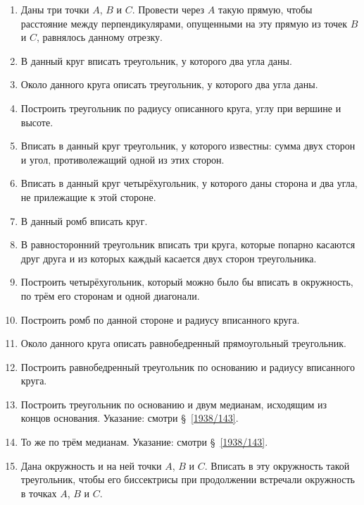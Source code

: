 \documentclass[oneside]{book}
\begin{document}
\begin{enumerate}[resume]
 \item
Даны три точки $A$, $B$ и $C$.
Провести через $A$ такую прямую, чтобы расстояние между перпендикулярами, опущенными на эту прямую из точек $B$ и $C$, равнялось данному отрезку.

 \item
В данный круг вписать треугольник, у которого два угла даны.

 \item
Около данного круга описать треугольник, у которого два угла даны.

 \item
Построить треугольник по радиусу описанного круга, углу при вершине и высоте.

 \item
Вписать в данный круг треугольник, у которого известны:
сумма двух сторон и угол, противолежащий одной из этих сторон.

 \item
Вписать в данный круг четырёхугольник, у которого даны сторона и два угла, не прилежащие к этой стороне.

 \item
В данный ромб вписать круг.

 \item
В равносторонний треугольник вписать три круга, которые попарно касаются друг друга и из которых каждый касается двух сторон треугольника.

 \item
Построить четырёхугольник, который можно было бы вписать в окружность, по трём его сторонам и одной диагонали.

 \item
Построить ромб по данной стороне и радиусу вписанного круга.

 \item
Около данного круга описать равнобедренный прямоугольный треугольник.

 \item
Построить равнобедренный треугольник по основанию и радиусу вписанного круга.

 \item
Построить треугольник по основанию и двум медианам, исходящим из концов основания.
Указание: смотри §~\ref{1938/143}.

 \item
То же по трём медианам.
Указание: смотри §~\ref{1938/143}.

 \item
Дана окружность и на ней точки $A$, $B$ и $C$.
Вписать в эту окружность такой треугольник, чтобы его биссектрисы при продолжении встречали окружность в точках $A$, $B$ и $C$.


\end{enumerate}
\end{document}
